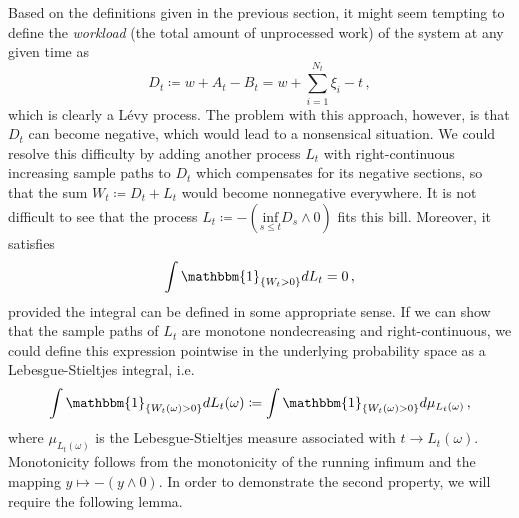 \documentclass[titlepage]{article}
\theoremstyle{plain}
\theoremstyle{definition}
\begin{document}
Based on the definitions given in the previous section, it might seem tempting to define the \emph{workload} (the total amount of unprocessed work) of the system at any given time as
\begin{equation} \label{eq:work}
  D_t \coloneqq w + A_t - B_t = w + \sum_{i = 1}^{N_t} \xi_{i} - t \,,
\end{equation}
which is clearly a L\'evy process. The problem with this approach, however, is that $D_t$ can become negative, which would lead to a nonsensical situation. We could resolve this difficulty by adding another process $L_t$ with right-continuous increasing sample paths to $D_t$ which compensates for its negative sections, so that the sum $W_t \coloneqq D_t + L_t$ would become nonnegative everywhere. It is not difficult to see that the process $L_t \coloneqq -(\underset{s \leq t}{\mathrm{inf}} D_s \wedge 0)$ fits this bill. Moreover, it satisfies
\begin{equation} \label{eq:work-integral}
  \int \mathbbm{1}_{\{ W_t > 0 \}} dL_t = 0 \,,
\end{equation}
provided the integral can be defined in some appropriate sense. If we can show that the sample paths of $L_t$ are monotone nondecreasing and right-continuous, we could define this expression pointwise in the underlying probability space as a Lebesgue-Stieltjes integral, i.e.\
\begin{equation}
  \int \mathbbm{1}_{\{ W_t(\omega) > 0 \}} dL_t(\omega) \coloneqq \int \mathbbm{1}_{\{ W_t(\omega) > 0 \}} d\mu_{L_t(\omega)} \,,
\end{equation}
where $\mu_{L_t(\omega)}$ is the Lebesgue-Stieltjes measure associated with $t \to L_t(\omega)$. Monotonicity follows from the monotonicity of the running infimum and the mapping $y \mapsto -(y \wedge 0)$. In order to demonstrate the second property, we will require the following lemma.
\end{document}

